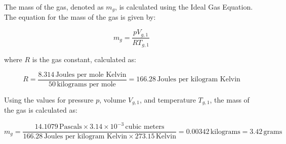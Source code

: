 The mass of the gas, denoted as \( m_g \), is calculated using the Ideal Gas Equation. The equation for the mass of the gas is given by:

\[ m_g = \frac{pV_{g,1}}{R T_{g,1}} \]

where \( R \) is the gas constant, calculated as:

\[ R = \frac{8.314 \, \text{Joules per mole Kelvin}}{50 \, \text{kilograms per mole}} = 166.28 \, \text{Joules per kilogram Kelvin} \]

Using the values for pressure \( p \), volume \( V_{g,1} \), and temperature \( T_{g,1} \), the mass of the gas is calculated as:

\[ m_g = \frac{14.1079 \, \text{Pascals} \times 3.14 \times 10^{-3} \, \text{cubic meters}}{166.28 \, \text{Joules per kilogram Kelvin} \times 273.15 \, \text{Kelvin}} = 0.00342 \, \text{kilograms} = 3.42 \, \text{grams} \]